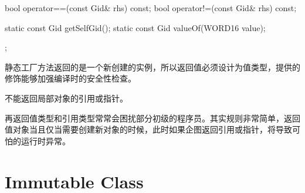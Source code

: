 \begin{content}
\begin{leftbar}
\begin{c++}
{    bool operator==(const Gid& rhs) const;
    bool operator!=(const Gid& rhs) const;

    static const Gid getSelfGid();
    static const Gid valueOf(WORD16 value);
};
\end{c++}
\end{leftbar}

静态工厂方法返回的是一个新创建的实例，所以返回值必须设计为值类型，提供的修饰能够加强编译时的安全性检查。

\begin{regulation}
不能返回局部对象的引用或指针。
\end{regulation}

再返回值类型和引用类型常常会困扰部分初级的程序员。其实规则非常简单，返回值对象当且仅当需要创建新对象的时候，此时如果企图返回引用或指针，将导致可怕的运行时异常。

\end{content}

\section{Immutable Class}

